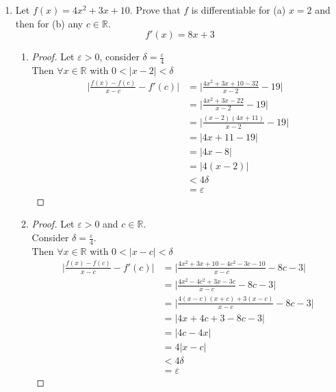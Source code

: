\documentclass[12pt]{article}
\begin{document}
\begin{enumerate}
    \item Let $f(x) = 4x^2 + 3x + 10$. Prove that $f$ is differentiable for (a) $x=2$ and then for (b) 
    any $c \in \mathbb{R}$.
    \[f'(x) = 8x+3 \]

    \begin{enumerate}
        \item \begin{proof}
            Let $\varepsilon > 0$, consider $\delta = \frac{\varepsilon}{4} $ \\
            Then $\forall x \in \mathbb{R}$ with $0 < |x-2| < \delta$
            \begin{align*}
                \bigg| \frac{f(x)-f(c)}{x-c} - f'(c) \bigg| &= \bigg| \frac{4x^2+3x+10 - 32}{x-2} - 19 \bigg| \\
                &= \bigg| \frac{4x^2+3x-22}{x-2} -19 \bigg| \\ 
                &= \bigg| \frac{(x-2)(4x+11)}{x-2} - 19 \bigg| \\
                &= | 4x+11-19 | \\
                &= |4x-8| \\
                &= |4(x-2)| \\
                &< 4\delta \\
                &= \varepsilon
            \end{align*}
        \end{proof}
        
        \item \begin{proof}
            Let $\varepsilon > 0$ and $c \in \mathbb{R}$. \\
            Consider $\delta = \frac{\varepsilon}{4}$. \\
            Then $\forall x \in \mathbb{R}$ with $0 < |x-c| < \delta$
            \begin{align*}
                \bigg| \frac{f(x)-f(c)}{x-c} - f'(c) \bigg| &= \bigg| \frac{4x^2+3x+10-4c^2-3c-10}{x-c} - 8c-3 \bigg| \\
                &= \bigg| \frac{4x^2-4c^2+3x-3c}{x-c} - 8c-3 \bigg| \\
                &= \bigg| \frac{4(x-c)(x+c) + 3(x-c)}{x-c} - 8c-3 \bigg| \\
                &= |4x+4c + 3 - 8c - 3| \\
                &= |4c-4x| \\
                &= 4|x-c| \\
                &< 4\delta \\
                &= \varepsilon
            \end{align*}
        \end{proof}
    \end{enumerate}
\end{enumerate}
\end{document}
